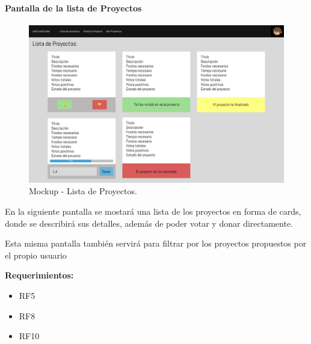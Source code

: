 \paragraph{Pantalla de la lista de Proyectos}
\begin{figure}[H]
        \centering
        \includegraphics[width=1\textwidth]{img/mockups/lista_proyectos.png}
        \caption{Mockup - Lista de Proyectos.}
        \label{fig:configApi}
\end{figure}

En la siguiente pantalla se mostará una lista de los proyectos en forma de cards, donde se describirá sus detalles, además de poder votar y donar directamente.

\bigskip

Esta misma pantalla también servirá para filtrar por los proyectos propuestos por el propio usuario

\bigskip

\textbf{Requerimientos: }
\begin{itemize}
    \item RF5
    \item RF8
    \item RF10
\end{itemize}

